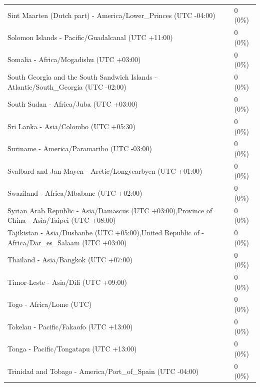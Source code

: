 \documentclass[
  english,
  man]{apa6}
\begin{document}
\begin{appendix}
\begin{table}
{\begin{tabular}[t]{ll}
\hspace{1em}Sint Maarten (Dutch part) - America/Lower\_Princes (UTC -04:00) & 0 (0\%)\\
\hspace{1em}Solomon Islands - Pacific/Guadalcanal (UTC +11:00) & 0 (0\%)\\
\hspace{1em}Somalia - Africa/Mogadishu (UTC +03:00) & 0 (0\%)\\
\addlinespace
\hspace{1em}South Georgia and the South Sandwich Islands - Atlantic/South\_Georgia (UTC -02:00) & 0 (0\%)\\
\hspace{1em}South Sudan - Africa/Juba (UTC +03:00) & 0 (0\%)\\
\hspace{1em}Sri Lanka - Asia/Colombo (UTC +05:30) & 0 (0\%)\\
\hspace{1em}Suriname - America/Paramaribo (UTC -03:00) & 0 (0\%)\\
\hspace{1em}Svalbard and Jan Mayen - Arctic/Longyearbyen (UTC +01:00) & 0 (0\%)\\
\addlinespace
\hspace{1em}Swaziland - Africa/Mbabane (UTC +02:00) & 0 (0\%)\\
\hspace{1em}Syrian Arab Republic - Asia/Damascus (UTC +03:00),Province of China - Asia/Taipei (UTC +08:00) & 0 (0\%)\\
\hspace{1em}Tajikistan - Asia/Dushanbe (UTC +05:00),United Republic of - Africa/Dar\_es\_Salaam (UTC +03:00) & 0 (0\%)\\
\hspace{1em}Thailand - Asia/Bangkok (UTC +07:00) & 0 (0\%)\\
\hspace{1em}Timor-Leste - Asia/Dili (UTC +09:00) & 0 (0\%)\\
\addlinespace
\hspace{1em}Togo - Africa/Lome (UTC) & 0 (0\%)\\
\hspace{1em}Tokelau - Pacific/Fakaofo (UTC +13:00) & 0 (0\%)\\
\hspace{1em}Tonga - Pacific/Tongatapu (UTC +13:00) & 0 (0\%)\\
\hspace{1em}Trinidad and Tobago - America/Port\_of\_Spain (UTC -04:00) & 0 (0\%)\\

\end{tabular}}
\end{table}
\end{appendix}
\end{document}
